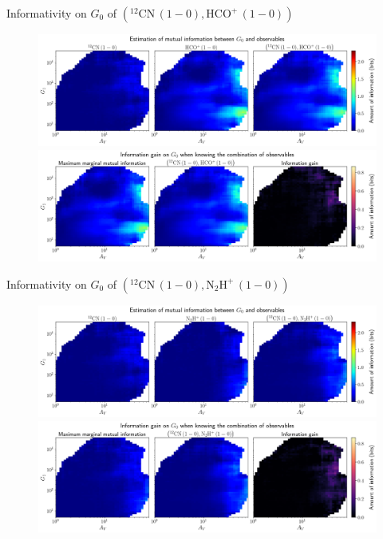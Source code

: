 \documentclass{beamer}
\begin{document}
\begin{frame}{Informativity on $G_0$ of $\left(\mathrm{^{12}CN\,(1-0)},\mathrm{HCO^+\,(1-0)}\right)$}
    \begin{figure}
        \centering
        \includegraphics[width=0.95\linewidth]{../mi/g0__12cn10_hcop10_mi.png}
        \vfill
        \includegraphics[width=0.95\linewidth]{../mi/g0__12cn10_hcop10_mi_gain.png}
    \end{figure}
\end{frame}

\begin{frame}{Informativity on $G_0$ of $\left(\mathrm{^{12}CN\,(1-0)},\mathrm{N_2H^+\,(1-0)}\right)$}
    \begin{figure}
        \centering
        \includegraphics[width=0.95\linewidth]{../mi/g0__12cn10_n2hp10_mi.png}
        \vfill
        \includegraphics[width=0.95\linewidth]{../mi/g0__12cn10_n2hp10_mi_gain.png}
    \end{figure}
\end{frame}
\end{document}

